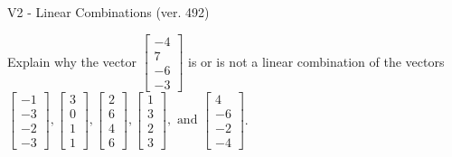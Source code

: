 \begin{exercise}
  \begin{exerciseTitle}V2 - Linear Combinations (ver. 492)\end{exerciseTitle}
  \begin{exerciseStatement}
    Explain why the vector \(\left[\begin{array}{c}
-4 \\
7 \\
-6 \\
-3
\end{array}\right]\)  is or is not a linear 
	combination of the vectors \(\left[\begin{array}{c}
-1 \\
-3 \\
-2 \\
-3
\end{array}\right] , \left[\begin{array}{c}
3 \\
0 \\
1 \\
1
\end{array}\right] , \left[\begin{array}{c}
2 \\
6 \\
4 \\
6
\end{array}\right] , \left[\begin{array}{c}
1 \\
3 \\
2 \\
3
\end{array}\right] , \text{ and } \left[\begin{array}{c}
4 \\
-6 \\
-2 \\
-4
\end{array}\right]\).
	



\end{exerciseStatement}
\end{exercise}
